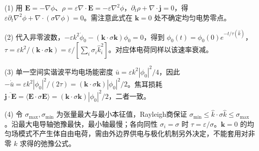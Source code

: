 (1) 用 \(\mathbf E=-\nabla\phi\)、\(\rho=\varepsilon\nabla\cdot\mathbf E=-\varepsilon\nabla^2\phi\)，\(\partial_t\rho+\nabla\cdot\mathbf j=0\)，得 \(\varepsilon\partial_t\nabla^2\phi+\nabla\cdot(\sigma\nabla\phi)=0\)。需注意此式在 \(\mathbf k=0\) 处不确定均匀电势零点。

(2) 代入非零波数，\(-\varepsilon k^2\dot\phi_0-(\mathbf k\cdot\sigma\mathbf k)\phi_0=0\)，得到 \(\phi_0(t)=\phi_0(0)e^{-t/\tau(\hat k)}\)，\(\tau=\varepsilon k^2/(\mathbf k\cdot\sigma\mathbf k)=\varepsilon/[\sum_i\sigma_i\hat k_i^2]\)。对应体电荷同样以该速率衰减。

(3) 单一空间实谐波平均电场能密度 \(\bar u=\varepsilon k^2|\phi_0|^2/4\)，因此 \(-\dot{\bar u}=\varepsilon k^2|\phi_0|^2/(2\tau)=(\mathbf k\cdot\sigma\mathbf k)|\phi_0|^2/2\)。焦耳损耗 \(\overline{\mathbf j\cdot\mathbf E}=\langle\mathbf E\cdot\sigma\mathbf E\rangle=(\mathbf k\cdot\sigma\mathbf k)|\phi_0|^2/2\)，二者一致。

(4) 令 \(\sigma_{\max},\sigma_{\min}\) 为张量最大与最小本征值，Rayleigh商保证 \(\sigma_{\min}\le\hat k\cdot\sigma\hat k\le\sigma_{\max}\)。沿最大电导轴弛豫最快，最小轴最慢；各向同性 \(\sigma_i=\sigma\) 时 \(\tau=\varepsilon/\sigma\)。\(\mathbf k=0\) 的均匀场模式不产生体自由电荷，需由外边界供电与极化机制另外决定，不能套用对非零 \(k\) 求得的弛豫公式。
